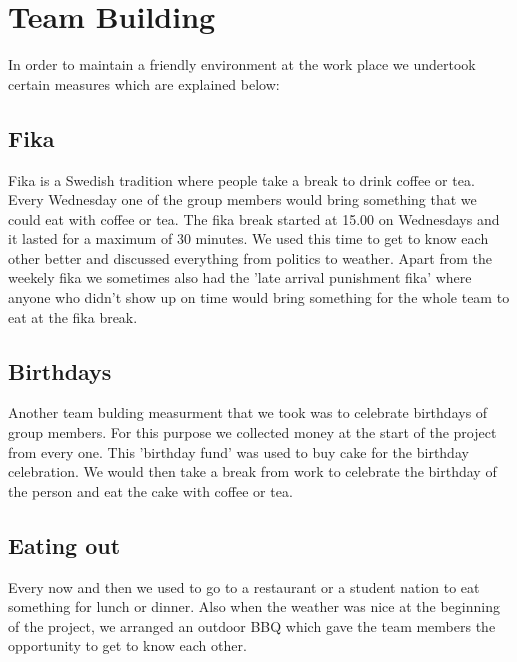 \section{Team Building}
In order to maintain a friendly environment at the work place we undertook certain measures which are explained below:

\subsection{Fika}
Fika is a Swedish tradition where people take a break to drink coffee or tea. Every Wednesday one of the group members would bring something that we could eat with coffee or tea. The fika break started at 15.00 on Wednesdays and it lasted for a maximum of 30 minutes. We used this time to get to know each other better and discussed everything from politics to weather. Apart from the weekely fika we sometimes also had the 'late arrival punishment fika' where anyone who didn't show up on time would bring something for the whole team to eat at the fika break.  

\subsection{Birthdays}
Another team bulding measurment that we took was to celebrate birthdays of group members. For this purpose we collected money at the start of the project from every one. This 'birthday fund' was used to buy cake for the birthday celebration. We would then take a break from work to celebrate the birthday of the person and eat the cake with coffee or tea. 

\subsection{Eating out}
Every now and then we used to go to a restaurant or a student nation to eat something for lunch or dinner. Also when the weather was nice at the beginning of the project, we arranged an outdoor BBQ which gave the team members the opportunity to get to know each other.    